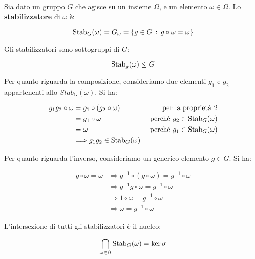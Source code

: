 Sia dato un gruppo $G$ che agisce su un insieme $\Omega$, e un elemento $\omega \in \Omega$. Lo \textbf{stabilizzatore} di $\omega$ è:

\begin{equation}
	\operatorname{Stab}_G(\omega) = G_\omega = \{g \in G \,:\, g \circ \omega = \omega\}
\end{equation}

\begin{teorema}
	Gli stabilizzatori sono sottogruppi di $G$:
	
	\begin{equation}
		\operatorname{Stab}_g(\omega) \le G
	\end{equation}
\end{teorema}
\begin{dimostrazione}
	Per quanto riguarda la composizione, consideriamo due elementi $g_1$ e $g_2$ appartenenti allo $Stab_G(\omega)$. Si ha:
	
	\begin{align}
		g_1g_2 \circ \omega &= g_1 \circ (g_2 \circ \omega) &\text{ per la proprietà 2} \\
		&= g_1 \circ \omega &\text{ perché } g_2 \in \operatorname{Stab}_G(\omega) \\
		&= \omega &\text{ perché } g_1 \in \operatorname{Stab}_G(\omega) \\
		& \Longrightarrow g_1g_2 \in \operatorname{Stab}_G(\omega)
	\end{align}

	Per quanto riguarda l'inverso, consideriamo un generico elemento $g \in G$. Si ha:
	
	\begin{align}
		g \circ \omega = \omega &\Longrightarrow g^{-1} \circ (g \circ \omega) = g^{-1} \circ \omega \\
		&\Longrightarrow g^{-1}g \circ \omega = g^{-1} \circ \omega \\
		&\Longrightarrow 1 \circ \omega = g^{-1} \circ \omega \\
		&\Longrightarrow \omega = g^{-1} \circ \omega
	\end{align}
\end{dimostrazione}

\begin{teorema}
	L'intersezione di tutti gli stabilizzatori è il nucleo:
	
	\begin{equation}
		\bigcap_{\omega \in \Omega}\operatorname{Stab}_G(\omega) = \ker \sigma
	\end{equation}
\end{teorema}

